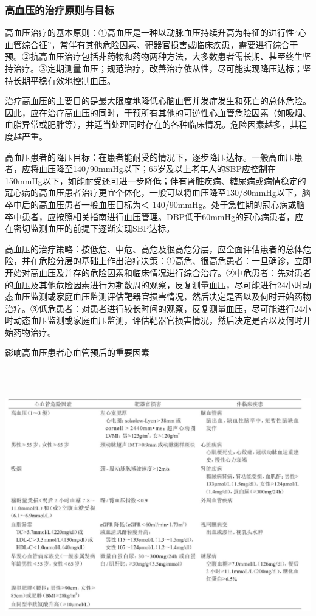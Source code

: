 \subsubsection{高血压的治疗原则与目标}

高血压治疗的基本原则：①高血压是一种以动脉血压持续升高为特征的进行性“心血管综合征”，常伴有其他危险因素、靶器官损害或临床疾患，需要进行综合干预。②抗高血压治疗包括非药物和药物两种方法，大多数患者需长期、甚至终生坚持治疗。③定期测量血压；规范治疗，改善治疗依从性，尽可能实现降压达标；坚持长期平稳有效地控制血压。

治疗高血压的主要目的是最大限度地降低心脑血管并发症发生和死亡的总体危险。因此，应在治疗高血压的同时，干预所有其他的可逆性心血管危险因素（如吸烟、血脂异常或肥胖等），并适当处理同时存在的各种临床情况。危险因素越多，其程度越严重。

高血压患者的降压目标：在患者能耐受的情况下，逐步降压达标。一般高血压患者，应将血压降至140/90mmHg以下；65岁及以上老年人的SBP应控制在150mmHg以下，如能耐受还可进一步降低；伴有肾脏疾病、糖尿病或病情稳定的冠心病的高血压患者治疗更宜个体化，一般可以将血压降至130/80mmHg以下，脑卒中后的高血压患者一般血压目标为＜
140/90mmHg。处于急性期的冠心病或脑卒中患者，应按照相关指南进行血压管理。DBP低于60mmHg的冠心病患者，应在密切监测血压的前提下逐渐实现SBP达标。

高血压的治疗策略：按低危、中危、高危及很高危分层，应全面评估患者的总体危险，并在危险分层的基础上作出治疗决策：①高危、很高危患者：一旦确诊，立即开始对高血压及并存的危险因素和临床情况进行综合治疗。②中危患者：先对患者的血压及其他危险因素进行为期数周的观察，反复测量血压，尽可能进行24小时动态血压监测或家庭血压监测评估靶器官损害情况，然后决定是否以及何时开始药物治疗。③低危患者：对患者进行较长时间的观察，反复测量血压，尽可能进行24小时动态血压监测或家庭血压监测，评估靶器官损害情况，然后决定是否以及何时开始药物治疗。

\begin{table}[htbp]
\centering
\caption{影响高血压患者心血管预后的重要因素}
\label{tab150-3}
\includegraphics[width=6.73958in,height=4.6875in]{./images/Image00556.jpg}
\end{table}


